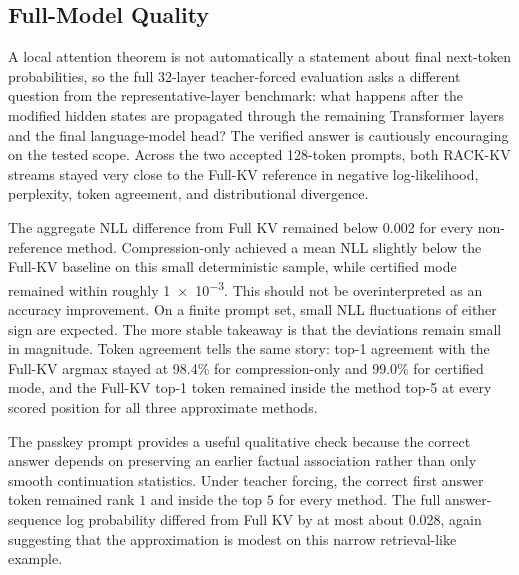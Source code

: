 \subsection{Full-Model Quality}

A local attention theorem is not automatically a statement about final next-token probabilities, so the full 32-layer teacher-forced evaluation asks a different question from the representative-layer benchmark: what happens after the modified hidden states are propagated through the remaining Transformer layers and the final language-model head? The verified answer is cautiously encouraging on the tested scope. Across the two accepted 128-token prompts, both RACK-KV streams stayed very close to the Full-KV reference in negative log-likelihood, perplexity, token agreement, and distributional divergence.

\begin{table}[t]
  \centering
  \small
  
  \caption{Verified 32-layer teacher-forced evaluation on two short prompt categories: natural-language continuation and passkey retrieval. The table reports aggregate metrics over \num{192} scored next-token predictions.}
  \label{tab:fullmodel}
\end{table}

The aggregate NLL difference from Full KV remained below \num{0.002} for every non-reference method. Compression-only achieved a mean NLL slightly below the Full-KV baseline on this small deterministic sample, while certified mode remained within roughly \num{1e-3}. This should not be overinterpreted as an accuracy improvement. On a finite prompt set, small NLL fluctuations of either sign are expected. The more stable takeaway is that the deviations remain small in magnitude. Token agreement tells the same story: top-1 agreement with the Full-KV argmax stayed at \num{98.4}\% for compression-only and \num{99.0}\% for certified mode, and the Full-KV top-1 token remained inside the method top-5 at every scored position for all three approximate methods.

The passkey prompt provides a useful qualitative check because the correct answer depends on preserving an earlier factual association rather than only smooth continuation statistics. Under teacher forcing, the correct first answer token remained rank \(1\) and inside the top \(5\) for every method. The full answer-sequence log probability differed from Full KV by at most about \num{0.028}, again suggesting that the approximation is modest on this narrow retrieval-like example.

